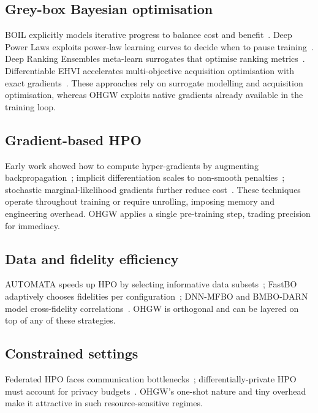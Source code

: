 \documentclass{article} %
\begin{document}
\subsection{Grey-box Bayesian optimisation}
BOIL explicitly models iterative progress to balance cost and benefit~\cite{nguyen-2019-bayesian}. Deep Power Laws exploits power-law learning curves to decide when to pause training~\cite{kadra-2023-scaling}. Deep Ranking Ensembles meta-learn surrogates that optimise ranking metrics~\cite{khazi-2023-deep}. Differentiable EHVI accelerates multi-objective acquisition optimisation with exact gradients~\cite{daulton-2020-differentiable}. These approaches rely on surrogate modelling and acquisition optimisation, whereas OHGW exploits native gradients already available in the training loop.

\subsection{Gradient-based HPO}
Early work showed how to compute hyper-gradients by augmenting backpropagation~\cite{chandra-2019-gradient}; implicit differentiation scales to non-smooth penalties~\cite{bertrand-2020-implicit}; stochastic marginal-likelihood gradients further reduce cost~\cite{immer-2023-stochastic}. These techniques operate throughout training or require unrolling, imposing memory and engineering overhead. OHGW applies a single pre-training step, trading precision for immediacy.

\subsection{Data and fidelity efficiency}
AUTOMATA speeds up HPO by selecting informative data subsets~\cite{killamsetty-2022-automata}; FastBO adaptively chooses fidelities per configuration~\cite{jiang-2024-efficient}; DNN-MFBO and BMBO-DARN model cross-fidelity correlations~\cite{li-2020-multi,li-2021-batch}. OHGW is orthogonal and can be layered on top of any of these strategies.

\subsection{Constrained settings}
Federated HPO faces communication bottlenecks~\cite{khodak-2021-federated}; differentially-private HPO must account for privacy budgets~\cite{panda-2022-new,wang-2023-hypo}. OHGW's one-shot nature and tiny overhead make it attractive in such resource-sensitive regimes.
\end{document}
